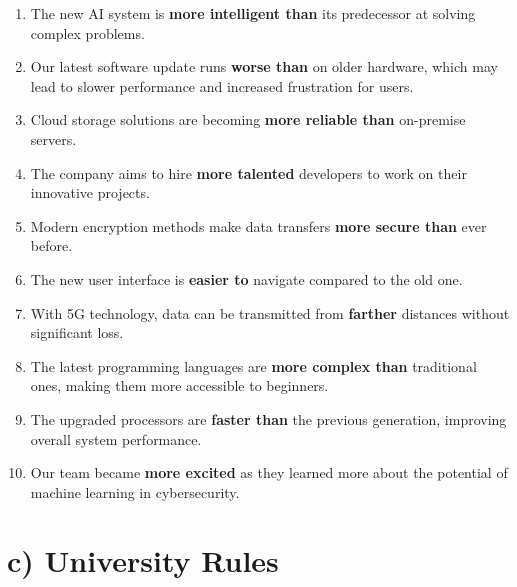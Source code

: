 \documentclass[12pt]{article}
\begin{document}
\begin{enumerate}[label=\arabic*.]
    \item The new AI system is \textbf{more intelligent than} its predecessor at solving complex problems.
    
    \item Our latest software update runs \textbf{worse than} on older hardware, which may lead to slower performance and increased frustration for users.
    
    \item Cloud storage solutions are becoming \textbf{more reliable than} on-premise servers.
    
    \item The company aims to hire \textbf{more talented} developers to work on their innovative projects.
    
    \item Modern encryption methods make data transfers \textbf{more secure than} ever before.
    
    \item The new user interface is \textbf{easier to} navigate compared to the old one.
    
    \item With 5G technology, data can be transmitted from \textbf{farther} distances without significant loss.
    
    \item The latest programming languages are \textbf{more complex than} traditional ones, making them more accessible to beginners.
    
    \item The upgraded processors are \textbf{faster than} the previous generation, improving overall system performance.
    
    \item Our team became \textbf{more excited} as they learned more about the potential of machine learning in cybersecurity.
\end{enumerate}

\section*{c) University Rules}
\end{document}
